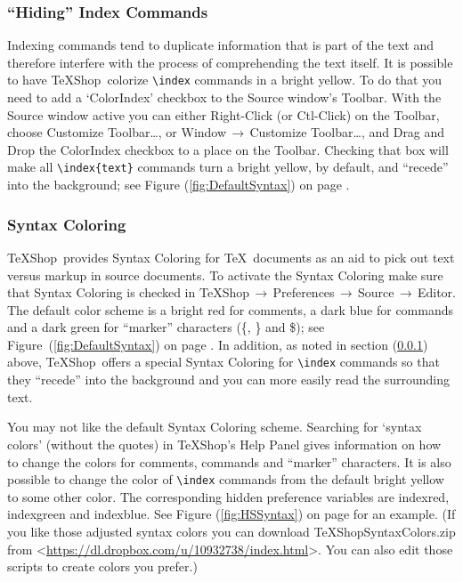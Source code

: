 \documentclass[letterpaper,11pt]{article}
\newcommand{\TS}{\textsf{\TeX Shop}}
\newcommand{\cmd}[1]{\textsf{#1}}
\newcommand{\mnu}[1]{\textsf{#1}}
\newcommand{\To}{\,\(\to\)\,}
\begin{document}
\subsubsection{``Hiding'' Index Commands}\label{sec:Index}

Indexing commands tend to duplicate information that is part of the text and therefore interfere with the process of comprehending the text itself. It is possible to have \TS\ colorize \verb|\index| commands in a bright yellow. To do that you need to add a `\cmd{ColorIndex}' checkbox to the Source window's Toolbar. With the Source window active you can either \cmd{Right-Click} (or \cmd{Ctl-Click}) on the Toolbar, choose \mnu{Customize Toolbar\dots}, or \mnu{Window}\To\mnu{Customize Toolbar\dots}, and Drag and Drop the \cmd{ColorIndex} checkbox to a place on the Toolbar. Checking that box will make all \verb"\index{text}" commands turn a bright yellow, by default, and ``recede'' into the background; see Figure (\ref{fig:DefaultSyntax}) on page \pageref{fig:DefaultSyntax}.

\subsubsection{Syntax Coloring}

\TS\ provides Syntax Coloring for \TeX\ documents as an aid to pick out text versus markup in source documents. To activate the Syntax Coloring make sure that \mnu{Syntax Coloring} is checked in \mnu{TeXShop}\To\mnu{Preferences}\To\mnu{Source}\To\mnu{Editor}. The default color scheme is a bright red for comments, a dark blue for commands and a dark green for ``marker'' characters (\cmd{\{}, \cmd{\}} and \cmd{\$}); see Figure~(\ref{fig:DefaultSyntax}) on page \pageref{fig:DefaultSyntax}. In addition, as noted in section (\ref{sec:Index}) above, \TS\ offers a special Syntax Coloring for \verb"\index" commands so that they ``recede'' into the background and you can more easily read the surrounding text.

You may not like the default Syntax Coloring scheme. Searching for `\cmd{syntax colors}' (without the quotes) in \TS's Help Panel gives information on how to change the colors for comments, commands and ``marker'' characters. It is also possible to change the color of \verb"\index" commands from the default bright yellow to some other color. The corresponding hidden preference variables are \cmd{indexred}, \cmd{indexgreen} and \cmd{indexblue}. See Figure (\ref{fig:HSSyntax}) on page \pageref{fig:HSSyntax} for an example. (If you like those adjusted syntax colors you can download \cmd{TeXShopSyntaxColors.zip} from <\url{https://dl.dropbox.com/u/10932738/index.html}>. You can also edit those scripts to create colors you prefer.)
\end{document}
